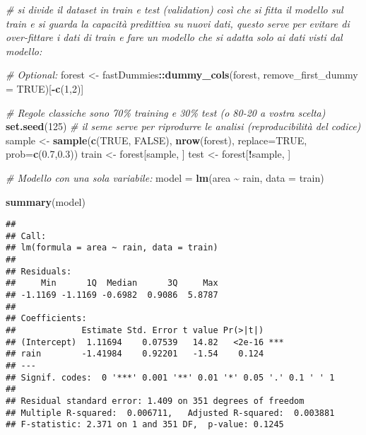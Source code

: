 \documentclass[
]{article}
\newenvironment{Shaded}{\begin{snugshade}}{\end{snugshade}}
\newcommand{\AttributeTok}[1]{\textcolor[rgb]{0.13,0.29,0.53}{#1}}
\newcommand{\CommentTok}[1]{\textcolor[rgb]{0.56,0.35,0.01}{\textit{#1}}}
\newcommand{\ConstantTok}[1]{\textcolor[rgb]{0.56,0.35,0.01}{#1}}
\newcommand{\DecValTok}[1]{\textcolor[rgb]{0.00,0.00,0.81}{#1}}
\newcommand{\FloatTok}[1]{\textcolor[rgb]{0.00,0.00,0.81}{#1}}
\newcommand{\FunctionTok}[1]{\textcolor[rgb]{0.13,0.29,0.53}{\textbf{#1}}}
\newcommand{\NormalTok}[1]{#1}
\newcommand{\OtherTok}[1]{\textcolor[rgb]{0.56,0.35,0.01}{#1}}
\newcommand{\SpecialCharTok}[1]{\textcolor[rgb]{0.81,0.36,0.00}{\textbf{#1}}}
\begin{document}
\begin{Shaded}
\begin{Highlighting}[]
\CommentTok{\# si divide il dataset in train e test (validation) così che si fitta il modello sul train e si guarda la capacità predittiva su nuovi dati, questo serve per evitare di over{-}fittare i dati di train e fare un modello che si adatta solo ai dati visti dal modello:}

\CommentTok{\# Optional:}
\NormalTok{forest }\OtherTok{\textless{}{-}}\NormalTok{ fastDummies}\SpecialCharTok{::}\FunctionTok{dummy\_cols}\NormalTok{(forest, }\AttributeTok{remove\_first\_dummy =} \ConstantTok{TRUE}\NormalTok{)[}\SpecialCharTok{{-}}\FunctionTok{c}\NormalTok{(}\DecValTok{1}\NormalTok{,}\DecValTok{2}\NormalTok{)]}

\CommentTok{\# Regole classiche sono 70\% training e 30\% test (o 80{-}20 a vostra scelta)}
\FunctionTok{set.seed}\NormalTok{(}\DecValTok{125}\NormalTok{) }\CommentTok{\# il seme serve per riprodurre le analisi (reproducibilità del codice)}
\NormalTok{sample }\OtherTok{\textless{}{-}} \FunctionTok{sample}\NormalTok{(}\FunctionTok{c}\NormalTok{(}\ConstantTok{TRUE}\NormalTok{, }\ConstantTok{FALSE}\NormalTok{), }\FunctionTok{nrow}\NormalTok{(forest), }\AttributeTok{replace=}\ConstantTok{TRUE}\NormalTok{, }\AttributeTok{prob=}\FunctionTok{c}\NormalTok{(}\FloatTok{0.7}\NormalTok{,}\FloatTok{0.3}\NormalTok{))}
\NormalTok{train  }\OtherTok{\textless{}{-}}\NormalTok{ forest[sample, ]}
\NormalTok{test   }\OtherTok{\textless{}{-}}\NormalTok{ forest[}\SpecialCharTok{!}\NormalTok{sample, ]}

\CommentTok{\# Modello con una sola variabile:}
\NormalTok{model }\OtherTok{=} \FunctionTok{lm}\NormalTok{(area }\SpecialCharTok{\textasciitilde{}}\NormalTok{ rain, }\AttributeTok{data =}\NormalTok{ train)}

\FunctionTok{summary}\NormalTok{(model)}
\end{Highlighting}
\end{Shaded}

\begin{verbatim}
## 
## Call:
## lm(formula = area ~ rain, data = train)
## 
## Residuals:
##     Min      1Q  Median      3Q     Max 
## -1.1169 -1.1169 -0.6982  0.9086  5.8787 
## 
## Coefficients:
##             Estimate Std. Error t value Pr(>|t|)    
## (Intercept)  1.11694    0.07539   14.82   <2e-16 ***
## rain        -1.41984    0.92201   -1.54    0.124    
## ---
## Signif. codes:  0 '***' 0.001 '**' 0.01 '*' 0.05 '.' 0.1 ' ' 1
## 
## Residual standard error: 1.409 on 351 degrees of freedom
## Multiple R-squared:  0.006711,   Adjusted R-squared:  0.003881 
## F-statistic: 2.371 on 1 and 351 DF,  p-value: 0.1245
\end{verbatim}
\end{document}
